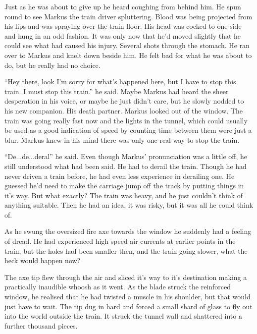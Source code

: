 Just as he was about to give up he heard coughing from behind him.  He spun round to see Markus the train driver spluttering.  Blood was being projected from his lips and was spraying over the train floor.  His head was cocked to one side and hung in an odd fashion.  It was only now that he'd moved slightly that he could see what had caused his injury.  Several shots through the stomach.  He ran over to Markus and knelt down beside him.  He felt bad for what he was about to do, but he really had no choice.

``Hey there, look I'm sorry for what's happened here, but I have to stop this train.  I must stop this train.''  he said.  Maybe Markus had heard the sheer desperation in his voice, or maybe he just didn't care, but he slowly nodded to his new companion.  His death partner.  Markus looked out of the window.  The train was going really fast now and the lights in the tunnel, which could usually be used as a good indication of speed by counting time between them were just a blur.  Markus knew in his mind there was only one real way to stop the train.  

``De...de...deral'' he said.  Even though Markus' pronunciation was a little off, he still understood what had been said.  He had to derail the train.  Though he had never driven a train before, he had even less experience in derailing one.  He guessed he'd need to make the carriage jump off the track by putting things in it's way.  But what exactly?  The train was heavy, and he just couldn't think of anything suitable.  Then he had an idea, it was risky, but it was all he could think of.



\thoughtbreak



As he swung the oversized fire axe towards the window he suddenly had a feeling of dread.  He had experienced high speed air currents at earlier points in the train, but the holes had been smaller then, and the train going slower, what the heck would happen now?

The axe tip flew through the air and sliced it's way to it's destination making a practically inaudible whoosh as it went.  As the blade struck the reinforced window, he realised that he had twisted a muscle in his shoulder, but that would just have to wait.  The tip dug in hard and forced a small shard of glass to fly out into the world outside the train.  It struck the tunnel wall and shattered into a further thousand pieces.

